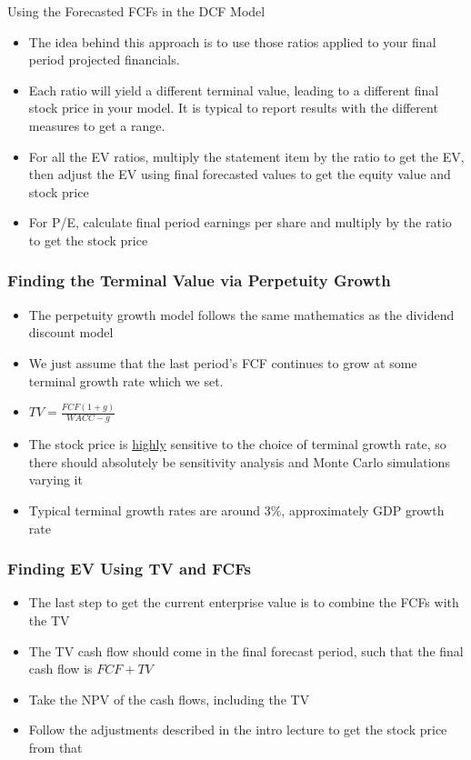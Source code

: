 \documentclass[handout, 11pt]{beamer}
\begin{document}
\begin{section}[Valuation]{Using the Forecasted FCFs in the DCF Model}
\begin{frame}
\begin{itemize}
\vfill
\item The idea behind this approach is to use those ratios applied to your final period projected financials.
\vfill
\item Each ratio will yield a different terminal value, leading to a different final stock price in your model. It is typical to report results with the different measures to get a range.
\vfill
\item For all the EV ratios, multiply the statement item by the ratio to get the EV, then adjust the EV using final forecasted values to get the equity value and stock price
\vfill
\item For P/E, calculate final period earnings per share and multiply by the ratio to get the stock price
\end{itemize}
\end{frame}
\begin{frame}
\frametitle{Finding the Terminal Value via Perpetuity Growth}
\begin{itemize}
\item The perpetuity growth model follows the same mathematics as the dividend discount model
\vfill
\item We just assume that the last period's FCF continues to grow at some terminal growth rate which we set.
\vfill
\item $TV = \frac{FCF (1 + g)}{WACC - g}$
\vfill
\item The stock price is
\underline{highly}
sensitive to the choice of terminal growth rate, so there should absolutely be sensitivity analysis and Monte Carlo simulations varying it
\vfill
\item Typical terminal growth rates are around 3\%, approximately GDP growth rate
\end{itemize}
\end{frame}
\begin{frame}
\frametitle{Finding EV Using TV and FCFs}
\begin{itemize}
\item The last step to get the current enterprise value is to combine the FCFs with the TV
\vfill
\item The TV cash flow should come in the final forecast period, such that the final cash flow is $FCF + TV$
\vfill
\item Take the NPV of the cash flows, including the TV
\vfill
\item Follow the adjustments described in the intro lecture to get the stock price from that
\end{itemize}

\end{frame}
\end{section}
\end{document}
